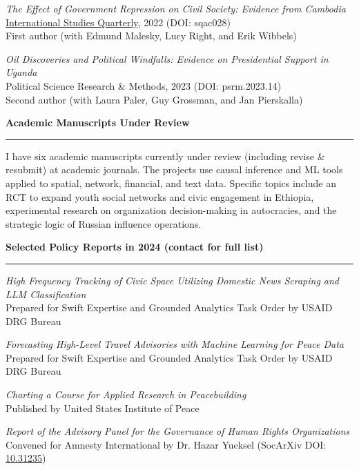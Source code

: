 \documentclass[11pt]{article}
\begin{document}
{\sl The Effect of Government Repression on Civil Society: Evidence from Cambodia}\\
\href{https://academic.oup.com/isq/article-abstract/66/3/sqac028/6631078?redirectedFrom=fulltext&login=false}{International Studies Quarterly}, 2022 (DOI: sqac028)\\
First author (with Edmund Malesky, Lucy Right, and Erik Wibbels)

{\sl Oil Discoveries and Political Windfalls: Evidence on Presidential Support in Uganda}\\
Political Science Research \& Methods, 2023 (DOI: psrm.2023.14)\\
Second author (with Laura Paler, Guy Grossman, and Jan Pierskalla)

\textbf{\large Academic Manuscripts Under Review}\\
\rule[3mm]{\textwidth}{.2pt}
I have six academic manuscripts currently under review (including revise \& resubmit) at academic journals. The projects use causal inference and ML tools applied to spatial, network, financial, and text data. Specific topics include an RCT to expand youth social networks and civic engagement in Ethiopia, experimental research on organization decision-making in autocracies, and the strategic logic of Russian influence operations.


\textbf{\large Selected Policy Reports in 2024 (contact for full list)}\\
\rule[3mm]{\textwidth}{.2pt}
{\sl High Frequency Tracking of Civic Space Utilizing Domestic News Scraping and LLM Classification}\\
Prepared for Swift Expertise and Grounded Analytics Task Order by USAID DRG Bureau

{\sl Forecasting High-Level Travel Advisories with Machine Learning for Peace Data}\\
Prepared for Swift Expertise and Grounded Analytics Task Order by USAID DRG Bureau

{\sl Charting a Course for Applied Research in Peacebuilding}\\
Published by United States Institute of Peace

{\sl Report of the Advisory Panel for the Governance of Human Rights Organizations}\\
Convened for Amnesty International by Dr. Hazar Yueksel (SocArXiv DOI: \href{https://doi.org/10.31235/osf.io/7devb}{10.31235})

\end{document}
